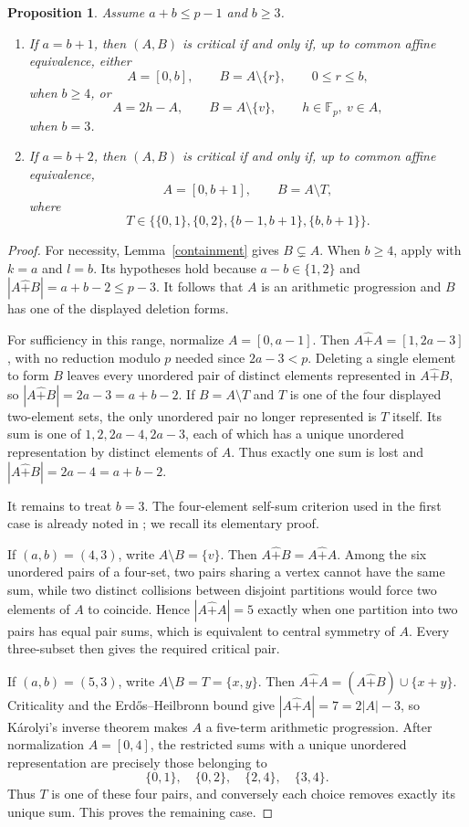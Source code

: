 \documentclass[12pt]{article}
\newtheorem{proposition}{Proposition}[section]
\theoremstyle{remark}
\newcommand{\F}{\mathbb{F}_p}
\newcommand{\rs}{\mathbin{\widehat+}}
\begin{document}
\begin{proposition}\label{smallgapclassification}
Assume $a+b\le p-1$ and $b\ge3$.
\begin{enumerate}[label=\textup{(\roman*)},nosep]
\item If $a=b+1$, then $(A,B)$ is critical if and only if, up to common
affine equivalence, either
\[
 A=[0,b],\qquad B=A\setminus\{r\},\qquad 0\le r\le b,
\]
when $b\ge4$, or
\[
 A=2h-A,\qquad B=A\setminus\{v\},\qquad h\in\F,\ v\in A,
\]
when $b=3$.
\item If $a=b+2$, then $(A,B)$ is critical if and only if, up to common
affine equivalence,
\[
 A=[0,b+1],\qquad B=A\setminus T,
\]
where
\[
 T\in\bigl\{\{0,1\},\{0,2\},\{b-1,b+1\},\{b,b+1\}\bigr\}.
\]
\end{enumerate}
\end{proposition}
\begin{proof}
For necessity, Lemma~\ref{containment} gives $B\subsetneq A$.
When $b\ge4$, apply \cite[Proposition 3.4]{LQ} with $k=a$ and $l=b$.
Its hypotheses hold because $a-b\in\{1,2\}$ and
$|A\rs B|=a+b-2\le p-3$.  It follows that $A$ is an arithmetic
progression and $B$ has one of the displayed deletion forms.

For sufficiency in this range, normalize $A=[0,a-1]$.
Then $A\rs A=[1,2a-3]$, with no reduction modulo $p$ needed since
$2a-3<p$.  Deleting a single element to form $B$ leaves every
unordered pair of distinct elements represented in $A\rs B$, so
$|A\rs B|=2a-3=a+b-2$.  If $B=A\setminus T$ and $T$ is one of the
four displayed two-element sets, the only unordered pair no longer
represented is $T$ itself.  Its sum is one of
$1,2,2a-4,2a-3$, each of which has a unique unordered representation
by distinct elements of $A$.  Thus exactly one sum is lost and
$|A\rs B|=2a-4=a+b-2$.

It remains to treat $b=3$.  The four-element self-sum criterion used
in the first case is already noted in \cite[Section 1]{Karolyi}; we
recall its elementary proof.

If $(a,b)=(4,3)$, write $A\setminus B=\{v\}$.  Then
$A\rs B=A\rs A$.  Among the six unordered pairs of a four-set, two
pairs sharing a vertex cannot have the same sum, while two distinct
collisions between disjoint partitions would force two elements of
$A$ to coincide.  Hence $|A\rs A|=5$ exactly when one partition into two pairs
has equal pair sums, which is equivalent to central symmetry of
$A$.  Every three-subset then gives the required critical pair.

If $(a,b)=(5,3)$, write $A\setminus B=T=\{x,y\}$.  Then
$A\rs A=(A\rs B)\cup\{x+y\}$.  Criticality and the Erd\H{o}s--Heilbronn bound give
$|A\rs A|=7=2|A|-3$, so K\'arolyi's inverse theorem \cite[Theorem 7]{Karolyi}
makes $A$ a five-term arithmetic progression.  After normalization
$A=[0,4]$, the restricted sums with a unique unordered representation
are precisely those belonging to
\[
 \{0,1\},\quad\{0,2\},\quad\{2,4\},\quad\{3,4\}.
\]
Thus $T$ is one of these four pairs, and conversely each choice removes
exactly its unique sum.  This proves the remaining case.
\end{proof}
\end{document}
